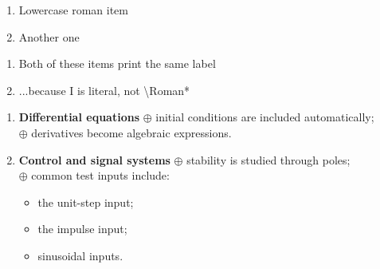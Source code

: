 \documentclass[11pt,a4paper]{article}
\theoremstyle{definition}                   %
\begin{document}
\begin{enumerate}[label=(\roman*)]         %
    \item Lowercase roman item
    \item Another one
\end{enumerate}

\begin{enumerate}[label={I}]
    \item Both of these items print the same label
    \item ...because {I} is literal, not \textbackslash Roman*
\end{enumerate}

\begin{enumerate}[leftmargin=*, label=]
    \item \textbf{Differential equations} $\oplus$ initial conditions are
          included automatically; \\
          $\oplus$ derivatives become algebraic expressions.
    \item \textbf{Control and signal systems} $\oplus$ stability is studied
          through poles; \\
          $\oplus$ common test inputs include:
        \begin{itemize}
            \item[$\rhd$] the unit-step input;
            \item[$\rhd$] the impulse input;
            \item[$\rhd$] sinusoidal inputs.
        \end{itemize}
\end{enumerate}
\end{document}
